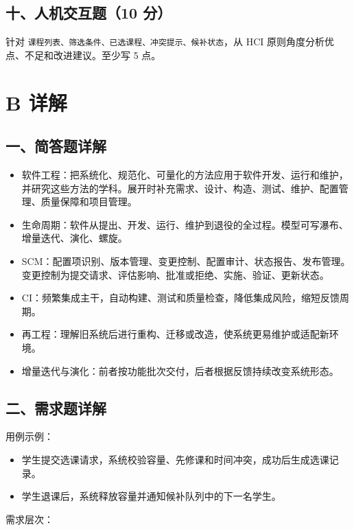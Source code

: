 \documentclass[UTF8,zihao=-4]{ctexart}
\begin{document}
\subsection{十、人机交互题（10 分）}


针对 \texttt{课程列表、筛选条件、已选课程、冲突提示、候补状态}，从 HCI 原则角度分析优点、不足和改进建议。至少写 5 点。


\section{B 详解}


\subsection{一、简答题详解}


\begin{itemize}
\item 软件工程：把系统化、规范化、可量化的方法应用于软件开发、运行和维护，并研究这些方法的学科。展开时补充需求、设计、构造、测试、维护、配置管理、质量保障和项目管理。
\item 生命周期：软件从提出、开发、运行、维护到退役的全过程。模型可写瀑布、增量迭代、演化、螺旋。
\item SCM：配置项识别、版本管理、变更控制、配置审计、状态报告、发布管理。变更控制为提交请求、评估影响、批准或拒绝、实施、验证、更新状态。
\item CI：频繁集成主干，自动构建、测试和质量检查，降低集成风险，缩短反馈周期。
\item 再工程：理解旧系统后进行重构、迁移或改造，使系统更易维护或适配新环境。
\item 增量迭代与演化：前者按功能批次交付，后者根据反馈持续改变系统形态。
\end{itemize}



\subsection{二、需求题详解}


用例示例：


\begin{itemize}
\item 学生提交选课请求，系统校验容量、先修课和时间冲突，成功后生成选课记录。
\item 学生退课后，系统释放容量并通知候补队列中的下一名学生。
\end{itemize}


需求层次：
\end{document}
